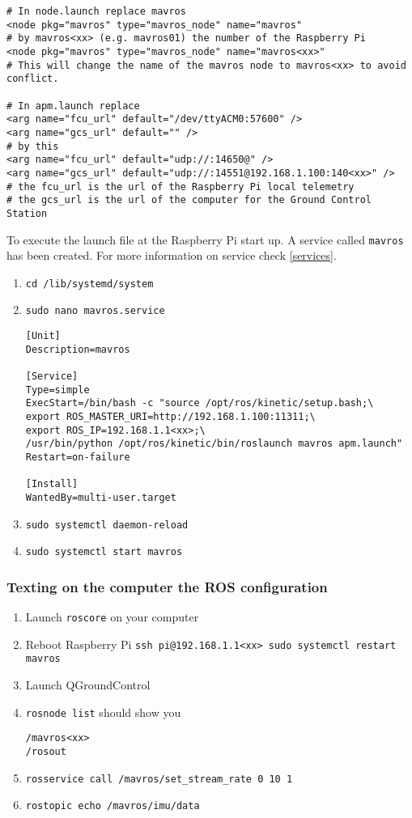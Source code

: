 \begin{verbatim}
# In node.launch replace mavros
<node pkg="mavros" type="mavros_node" name="mavros"
# by mavros<xx> (e.g. mavros01) the number of the Raspberry Pi
<node pkg="mavros" type="mavros_node" name="mavros<xx>"
# This will change the name of the mavros node to mavros<xx> to avoid conflict.

# In apm.launch replace
<arg name="fcu_url" default="/dev/ttyACM0:57600" />
<arg name="gcs_url" default="" />
# by this
<arg name="fcu_url" default="udp://:14650@" />
<arg name="gcs_url" default="udp://:14551@192.168.1.100:140<xx>" />
# the fcu_url is the url of the Raspberry Pi local telemetry
# the gcs_url is the url of the computer for the Ground Control Station
\end{verbatim}

To execute the launch file at the Raspberry Pi start up. A service called \texttt{mavros} has been created.
For more information on service check \ref{services}.

\begin{enumerate}
    \item \texttt{cd /lib/systemd/system}
    \item \texttt{sudo nano mavros.service}
          \begin{verbatim}
[Unit]
Description=mavros

[Service]
Type=simple
ExecStart=/bin/bash -c "source /opt/ros/kinetic/setup.bash;\
export ROS_MASTER_URI=http://192.168.1.100:11311;\
export ROS_IP=192.168.1.1<xx>;\
/usr/bin/python /opt/ros/kinetic/bin/roslaunch mavros apm.launch"
Restart=on-failure

[Install]
WantedBy=multi-user.target
                    \end{verbatim}
    \item \texttt{sudo systemctl daemon-reload}
    \item \texttt{sudo systemctl start mavros}
\end{enumerate}

\subsubsection{Texting on the computer the ROS configuration}
\begin{enumerate}
    \item Launch \texttt{roscore} on your computer
    \item Reboot Raspberry Pi \texttt{ssh pi@192.168.1.1<xx> sudo systemctl restart mavros}
    \item Launch QGroundControl
    \item \texttt{rosnode list} should show you

          \begin{verbatim}
/mavros<xx>
/rosout
          \end{verbatim}
    \item \texttt{rosservice call /mavros/set\_stream\_rate 0 10 1}
    \item \texttt{rostopic echo /mavros/imu/data}
\end{enumerate}

